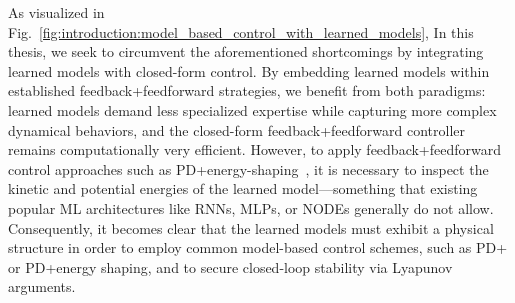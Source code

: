 As visualized in Fig.~\ref{fig:introduction:model_based_control_with_learned_models}, In this thesis, we seek to circumvent the aforementioned shortcomings by integrating learned models with closed-form control. By embedding learned models within established feedback+feedforward strategies, we benefit from both paradigms: learned models demand less specialized expertise while capturing more complex dynamical behaviors, and the closed-form feedback+feedforward controller remains computationally very efficient. However, to apply feedback+feedforward control approaches such as PD+energy-shaping~\cite{della2023model, caasenbrood2023control}, it is necessary to inspect the kinetic and potential energies of the learned model—something that existing popular \gls{ML} architectures like \glspl{RNN}, \glspl{MLP}, or \glspl{NODE} generally do not allow. Consequently, it becomes clear that the learned models must exhibit a physical structure in order to employ common model-based control schemes, such as PD+ or PD+energy shaping, and to secure closed-loop stability via Lyapunov arguments.


